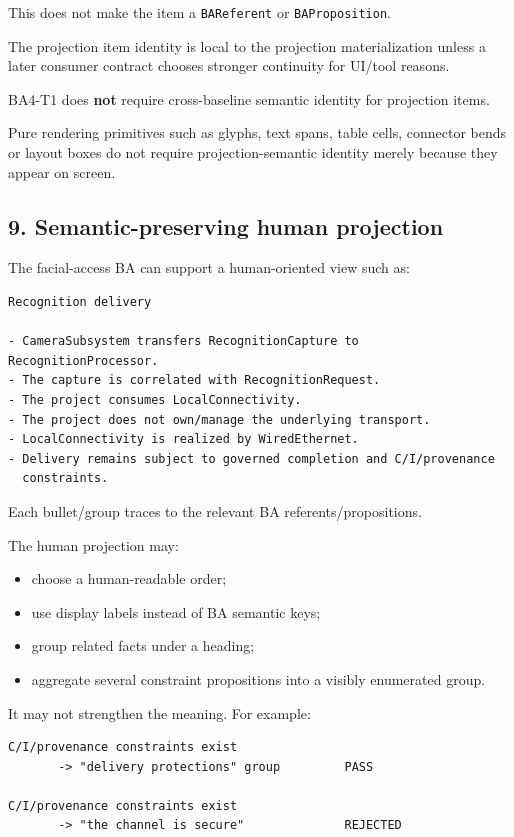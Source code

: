 \documentclass[11pt,a4paper]{article}
\providecommand{\tightlist}{\setlength{\itemsep}{0pt}\setlength{\parskip}{0pt}}
\begin{document}
This does not make the item a \texttt{BAReferent} or \texttt{BAProposition}.

The projection item identity is local to the projection materialization unless a later consumer contract chooses stronger continuity for UI/tool reasons.

BA4-T1 does \textbf{not} require cross-baseline semantic identity for projection items.

Pure rendering primitives such as glyphs, text spans, table cells, connector bends or layout boxes do not require projection-semantic identity merely because they appear on screen.

\subsection{9. Semantic-preserving human projection}\label{9-semantic-preserving-human-projection}

The facial-access BA can support a human-oriented view such as:

\begin{verbatim}
Recognition delivery

- CameraSubsystem transfers RecognitionCapture to RecognitionProcessor.
- The capture is correlated with RecognitionRequest.
- The project consumes LocalConnectivity.
- The project does not own/manage the underlying transport.
- LocalConnectivity is realized by WiredEthernet.
- Delivery remains subject to governed completion and C/I/provenance
  constraints.
\end{verbatim}

Each bullet/group traces to the relevant BA referents/propositions.

The human projection may:

\begin{itemize}
\tightlist
\item
  choose a human-readable order;
\item
  use display labels instead of BA semantic keys;
\item
  group related facts under a heading;
\item
  aggregate several constraint propositions into a visibly enumerated group.
\end{itemize}

It may not strengthen the meaning. For example:

\begin{verbatim}
C/I/provenance constraints exist
       -> "delivery protections" group         PASS

C/I/provenance constraints exist
       -> "the channel is secure"              REJECTED
\end{verbatim}
\end{document}
